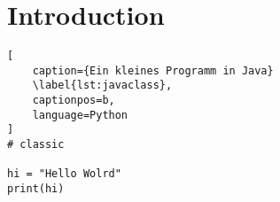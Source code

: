 \chapter{Introduction}
\lipsum[1]
\begin{lstlisting}[
	caption={Ein kleines Programm in Java}
   	\label{lst:javaclass},
   	captionpos=b,
   	language=Python
]
# classic

hi = "Hello Wolrd"
print(hi)
\end{lstlisting}